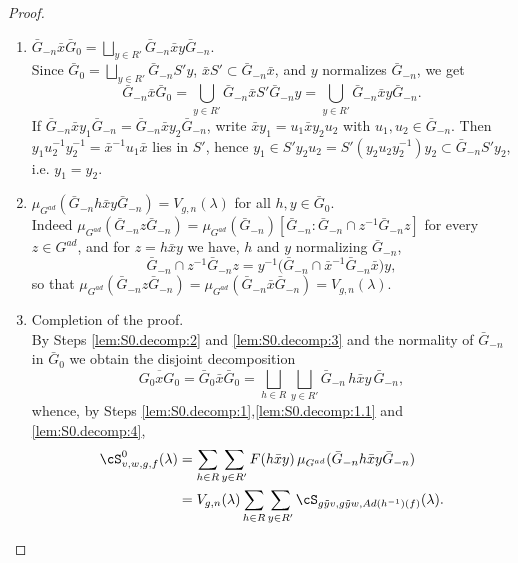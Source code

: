 \documentclass[12pt,a4paper]{amsart}%
\begin{document}
\begin{proof}
\begin{enumerate}[Step 1.]
\item\label{lem:S0.decomp:3} $\bar G_{-n}\bar x\bar G_0=\bigsqcup_{y\in R'}\bar G_{-n}\bar xy\bar G_{-n}$.\\
Since $\bar G_0=\bigsqcup_{y\in R'}\bar G_{-n}S'y$, $\bar xS'\subset \bar G_{-n}\bar x$, and $y$ normalizes $\bar G_{-n}$, we get
$$\bar G_{-n}\bar x\bar G_0=\bigcup_{y\in R'}\bar G_{-n}\bar xS'\bar G_{-n}y=\bigcup_{y\in R'}\bar G_{-n}\bar xy\bar G_{-n}.$$
If $\bar G_{-n}\bar xy_1\bar G_{-n}=\bar G_{-n}\bar xy_2\bar G_{-n}$, write $\bar xy_1=u_1\bar xy_2u_2$ with $u_1,u_2\in \bar G_{-n}$. Then $y_1u_2^{-1}y_2^{-1}=\bar x^{-1}u_1\bar x$ lies in $S'$, hence $y_1\in S'y_2u_2=S'(y_2u_2y_2^{-1})y_2\subset \bar G_{-n}S'y_2$, i.e. $y_1=y_2$.

\item\label{lem:S0.decomp:4} $\mu_{G^{ad}}(\bar G_{-n}h\bar xy\bar G_{-n})=V_{g,n}(\lambda)$ for all $h,y\in \bar G_0$.\\
Indeed $\mu_{G^{ad}}(\bar G_{-n}z\bar G_{-n})=\mu_{G^{ad}}(\bar G_{-n})[\bar G_{-n}:\bar G_{-n}\cap z^{-1}\bar G_{-n}z]$ for every $z\in G^{ad}$, and for $z=h\bar xy$ we have, $h$ and $y$ normalizing $\bar G_{-n}$,
$$\bar G_{-n}\cap z^{-1}\bar G_{-n}z=y^{-1}\bigl(\bar G_{-n}\cap \bar x^{-1}\bar G_{-n}\bar x\bigr)y ,$$
so that $\mu_{G^{ad}}(\bar G_{-n}z\bar G_{-n})=\mu_{G^{ad}}(\bar G_{-n}\bar x\bar G_{-n})=V_{g,n}(\lambda)$.

\item Completion of the proof.\\
By Steps \ref{lem:S0.decomp:2} and \ref{lem:S0.decomp:3} and the normality of $\bar G_{-n}$ in $\bar G_0$ we obtain the disjoint decomposition
$$\overline{G_0xG_0}=\bar G_0\bar x\bar G_0=\bigsqcup_{h\in R}\bigsqcup_{y\in R'}\bar G_{-n}\,h\bar xy\,\bar G_{-n},$$
whence, by Steps \ref{lem:S0.decomp:1},\ref{lem:S0.decomp:1.1} and \ref{lem:S0.decomp:4},
\begin{align*}
\cS^0_{v,w,g,f}(\lambda)&=\sum_{h\in R}\sum_{y\in R'}F(h\bar xy)\,\mu_{G^{ad}}(\bar G_{-n}h\bar xy\bar G_{-n})\\
&=V_{g,n}(\lambda)\sum_{h\in R}\sum_{y\in R'}\cS_{g\tilde yv,g\tilde yw,Ad(h^{-1})(f)}(\lambda).
\end{align*}
\end{enumerate}

\end{proof}
\end{document}

